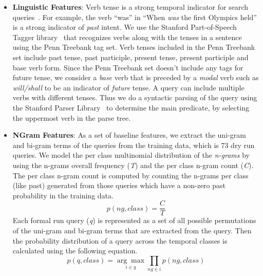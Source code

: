 \documentclass{sig-alternate}
\begin{document}
\begin{itemize}
In the dry run queries only 16 out of 100 contained time expressions that can be used to estimate the time distance, this reflects how rare it is to find explicit or implicit temporal expressions in a search query. Thus in order to obtain more candidate temporal expressions for the formal and dry run queries, we used the freely accessible GTE\footnote{http://www.ccc.ipt.pt/~ricardo/software.html} web service detailed in \cite{gte}. Given a query, the GTE web service returns a set of candidate years extracted from the \textit{top 50 web snippets} returned by the Bing Search API.  
\item\textbf{Linguistic Features}:
Verb tense is a strong temporal indicator for search queries~\cite{tuta}. For example, the verb ``was'' in ``When \textit{was} the first Olympics held'' is a strong indicator of \textit{past} intent. We use the Stanford Part-of-Speech Tagger library~\cite{postagger} that recognizes verbs along with the tenses in a sentence using the Penn Treebank tag set. Verb tenses included in the Penn Treebank set include past tense, past participle, present tense, present participle and base verb form. Since the Penn Treebank set doesn't include any tags for future tense, we consider a \textit{base} verb that is preceded by a \textit{modal} verb such as \textit{will/shall} to be an indicator of \textit{future} tense. A query can include multiple verbs with different tenses. Thus we do a syntactic parsing of the query using the Stanford Parser Library~\cite{parser} to determine the main predicate, by selecting the uppermost verb in the parse tree. 
\item\textbf{NGram Features}:
As a set of baseline features, we extract the uni-gram and bi-gram terms of the queries from the training data, which is 73 dry run queries. We model the per class multinomial distribution of the \textit{n-grams} by using the n-grams overall frequency (\textit{T}) and the per class n-gram count (\textit{C}). The per class n-gram count is computed by counting the n-grams per class (like past) generated from those queries which have a non-zero past probability in the training data.
\begin{equation}\label{eq:1}
p(ng, class) = \frac{C}{T}
\end{equation}
Each formal run query (\textit{q}) is represented as a set of all possible permutations of the uni-gram and bi-gram terms that are extracted from the query. Then the probability distribution of a query across the temporal classes is calculated using the following equation.
\begin{equation}\label{eq:2}
p(q,class) =\underset{i\in q}{\arg\max}\prod_{ng \in i}p(ng, class)
\end{equation}
\end{itemize}
\end{document}
